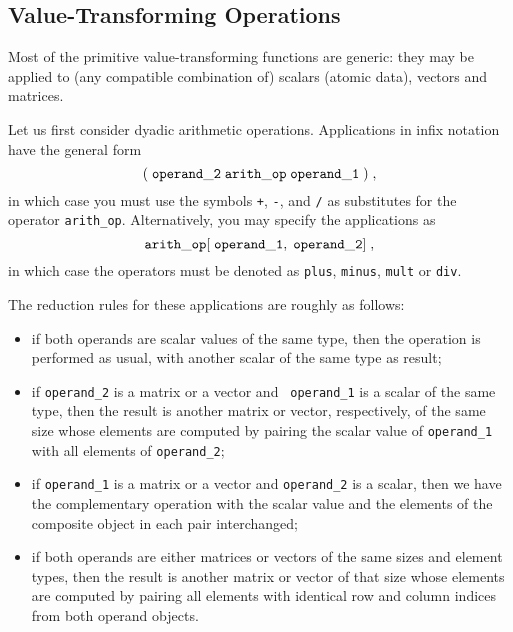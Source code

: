 \subsection{Value-Transforming Operations}
Most of the primitive {\mys value-transforming
functions} are {\mys generic}: they  may be applied to (any compatible 
combination of) scalars (atomic data), vectors and matrices.

Let us first consider {\mys dyadic arithmetic operations}. 
Applications in infix notation have the general form
$$
{\tt (\;operand\_2\;arith\_op\;operand\_1\;)} \;,
$$
in which case you must use the symbols
{\tt +}, {\tt -}, {\tt *} and {\tt /} as substitutes for the
operator {\tt arith\_op}. Alternatively, you may specify
the applications as
$$
{\tt arith\_op[\;operand\_1,\;operand\_2]}\;,
$$
in which case the operators must be denoted as {\tt plus},
 {\tt minus}, {\tt mult} or  {\tt div}.

The reduction rules for these applications are roughly as follows:
\begin{itemize}
\item if both operands are scalar values of the same type,
 then the operation is performed as usual, with another
scalar of the same type as result;
\item if {\tt operand\_2} is a matrix or a vector and {\tt
operand\_1} is a scalar of the same type, then the result
is another matrix or vector, respectively, of the same size
whose elements are computed by pairing the
scalar value of {\tt operand\_1} with all elements of
 {\tt operand\_2};
\item if {\tt operand\_1} is a matrix  or a vector 
and {\tt operand\_2} is a scalar, then we have the
 complementary operation with the scalar value and the elements of
the composite object in each pair interchanged;
\item if both operands are either matrices or vectors of the same
sizes and element types, then the result is another matrix
or vector of that size whose elements are computed by
pairing all elements with identical
row and column indices from both operand objects.
\end{itemize}

